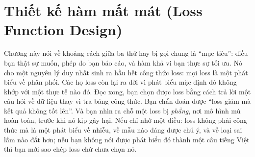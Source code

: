 \documentclass[../../deep_learning.tex]{subfiles}
\begin{document}
\chapter{Thiết kế hàm mất mát (Loss Function Design)}

\begin{tomtat}
Chương này nói về khoảng cách giữa ba thứ hay bị gọi chung là ``mục tiêu'': điều bạn thật sự muốn, phép đo bạn báo cáo, và hàm khả vi bạn thực sự tối ưu. Nó cho một nguyên lý duy nhất sinh ra hầu hết công thức loss: mọi loss là một phát biểu về phân phối. Các họ loss còn lại ra đời vì phát biểu mặc định đó không khớp với một thực tế nào đó. Đọc xong, bạn chọn được loss bằng cách trả lời một câu hỏi về dữ liệu thay vì tra bảng công thức. Bạn chẩn đoán được ``loss giảm mà kết quả không tốt lên''. Và bạn nhìn ra chỗ một loss bị \emph{phẳng}, nơi mô hình mù hoàn toàn, trước khi nó kịp gây hại. Nếu chỉ nhớ một điều: loss không phải công thức mà là một phát biểu về nhiễu, về mẫu nào đáng được chú ý, và về loại sai lầm nào đắt hơn; nếu bạn không nói được phát biểu đó thành một câu tiếng Việt thì bạn mới sao chép loss chứ chưa chọn nó.
\end{tomtat}
\end{document}
